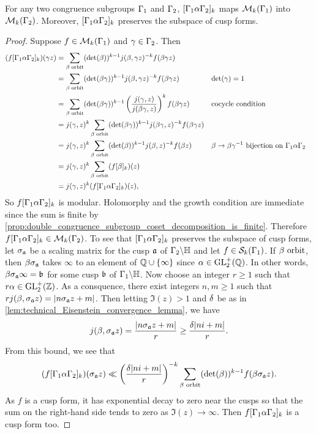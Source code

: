       \begin{proposition}\label{prop:double_coset_operator_preserves_subspaces_modular}
        For any two congruence subgroups $\Gamma_{1}$ and $\Gamma_{2}$, $[\Gamma_{1}\alpha\Gamma_{2}]_{k}$ maps $\mathcal{M}_{k}(\Gamma_{1})$ into $\mathcal{M}_{k}(\Gamma_{2})$. Moreover, $[\Gamma_{1}\alpha\Gamma_{2}]_{k}$ preserves the subspace of cusp forms.
      \end{proposition}
      \begin{proof}
        Suppose $f \in \mathcal{M}_{k}(\Gamma_{1})$ and $\gamma \in \Gamma_{2}$. Then
        \begin{align*}
          (f[\Gamma_{1}\alpha\Gamma_{2}]_{k})(\gamma z) &= \sum_{\beta \text{ orbit}}(\det(\beta))^{k-1}j(\beta,\gamma z)^{-k}f(\beta\gamma z) \\
          &= \sum_{\beta \text{ orbit}}(\det(\beta\gamma))^{k-1}j(\beta,\gamma z)^{-k}f(\beta\gamma z) && \text{$\det(\gamma) = 1$} \\
          &= \sum_{\beta \text{ orbit}}(\det(\beta\gamma))^{k-1}\left(\frac{j(\gamma,z)}{j(\beta\gamma,z)}\right)^{k}f(\beta\gamma z) && \text{cocycle condition} \\
          &= j(\gamma,z)^{k}\sum_{\beta \text{ orbit}}(\det(\beta\gamma))^{k-1}j(\beta\gamma,z)^{-k}f(\beta\gamma z) \\
          &= j(\gamma,z)^{k}\sum_{\beta \text{ orbit}}(\det(\beta))^{k-1}j(\beta,z)^{-k}f(\beta z) && \text{$\beta \to \beta\gamma^{-1}$ bijection on $\Gamma_{1}\alpha\Gamma_{2}$} \\
          &= j(\gamma,z)^{k}\sum_{\beta \text{ orbit}}(f[\beta]_{k})(z) \\
          &= j(\gamma,z)^{k}(f[\Gamma_{1}\alpha\Gamma_{2}]_{k})(z),
        \end{align*}
        So $f[\Gamma_{1}\alpha\Gamma_{2}]_{k}$ is modular. Holomorphy and the growth condition are immediate since the sum is finite by \cref{prop:double_congruence_subgroup_coset_decomposition_is_finite}. Therefore $f[\Gamma_{1}\alpha\Gamma_{2}]_{k} \in \mathcal{M}_{k}(\Gamma_{2})$. To see that $[\Gamma_{1}\alpha\Gamma_{2}]_{k}$ preserves the subspace of cusp forms, let $\sigma_{\mathfrak{a}}$ be a scaling matrix for the cusp $\mathfrak{a}$ of $\Gamma_{2}\backslash\mathbb{H}$ and let $f \in \mathcal{S}_{k}(\Gamma_{1})$. If $\beta \text{ orbit}$, then $\beta\sigma_{\mathfrak{a}}$ takes $\infty$ to an element of $\mathbb{Q} \cup \{\infty\}$ since $\alpha \in \mathrm{GL}_{2}^{+}(\mathbb{Q})$. In other words, $\beta\sigma_{\mathfrak{a}}\infty = \mathfrak{b}$ for some cusp $\mathfrak{b}$ of $\Gamma_{1}\backslash\mathbb{H}$. Now choose an integer $r \ge 1$ such that $r\alpha \in \mathrm{GL}_{2}^{+}(\mathbb{Z})$. As a consquence, there exist integers $n,m \ge 1$ such that $rj(\beta,\sigma_{\mathfrak{a}}z) = |n\sigma_{\mathfrak{a}}z+m|$. Then letting $\Im(z) > 1$ and $\delta$ be as in \cref{lem:technical_Eisenstein_convergence_lemma}, we have
        \[
          j(\beta,\sigma_{\mathfrak{a}}z) = \frac{|n\sigma_{\mathfrak{a}}z+m|}{r} \ge \frac{\delta|ni+m|}{r}.
        \]
        From this bound, we see that
        \[
          (f[\Gamma_{1}\alpha\Gamma_{2}]_{k})(\sigma_{\mathfrak{a}}z) \ll \left(\frac{\delta|ni+m|}{r}\right)^{-k}\sum_{\beta \text{ orbit}}(\det(\beta))^{k-1}f(\beta\sigma_{\mathfrak{a}} z).
        \]
        As $f$ is a cusp form, it has exponential decay to zero near the cusps so that the sum on the right-hand side tends to zero as $\Im(z) \to \infty$. Then $f[\Gamma_{1}\alpha\Gamma_{2}]_{k}$ is a cusp form too.
      \end{proof}

